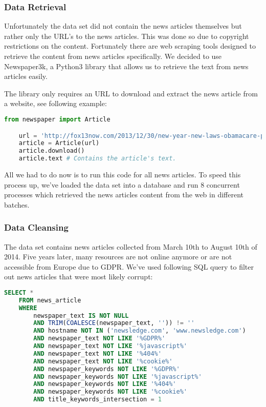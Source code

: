 \subsubsection{Data Retrieval}
\label{subsubsec:4a_data_retrieval}

Unfortunately the data set did not contain the news articles themselves but rather only the URL's to the news articles.
This was done so due to copyright restrictions on the content.
Fortunately there are web scraping tools designed to retrieve the content from news articles specifically.
We decided to use Newspaper3k\cite{newspaper3k},
a Python3 library that allows us to retrieve the text from news articles easily.

The library only requires an URL to download and extract the news article from a website, see following example:

\begin{lstlisting}[language=Python, caption=Retrieve the news article from an URL., label={lst:newspaper3k_code}]
    from newspaper import Article

    url = 'http://fox13now.com/2013/12/30/new-year-new-laws-obamacare-pot-guns-and-drones/'
    article = Article(url)
    article.download()
    article.text # Contains the article's text.
\end{lstlisting}

All we had to do now is to run this code for all news articles.
To speed this process up, we've loaded the data set into a database and run 8 concurrent processes which
retrieved the news articles content from the web in different batches.

\subsubsection{Data Cleansing}
\label{subsubsec:4a_data_cleansing}

The data set contains news articles collected from March 10th to August 10th of 2014.
Five years later, many resources are not online anymore or are not accessible from Europe due to GDPR.
We've used following SQL query to filter out news articles that were most likely corrupt:

\begin{lstlisting}[language=SQL, caption=Retrieve valid news articles., label={lst:valid_news_articles_sql}]
    SELECT *
    FROM news_article
    WHERE
        newspaper_text IS NOT NULL
        AND TRIM(COALESCE(newspaper_text, '')) != ''
        AND hostname NOT IN ('newsledge.com', 'www.newsledge.com')
        AND newspaper_text NOT LIKE '%GDPR%'
        AND newspaper_text NOT LIKE '%javascript%'
        AND newspaper_text NOT LIKE '%404%'
        AND newspaper_text NOT LIKE '%cookie%'
        AND newspaper_keywords NOT LIKE '%GDPR%'
        AND newspaper_keywords NOT LIKE '%javascript%'
        AND newspaper_keywords NOT LIKE '%404%'
        AND newspaper_keywords NOT LIKE '%cookie%'
        AND title_keywords_intersection = 1
\end{lstlisting}



